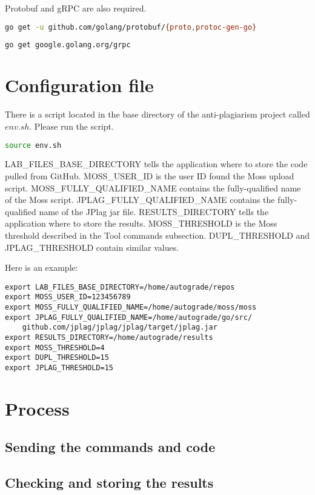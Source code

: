 \documentclass[12pt]{article}
\begin{document}
			Protobuf and gRPC are also required.

			\begin{lstlisting}[language=bash]
go get -u github.com/golang/protobuf/{proto,protoc-gen-go}
			
go get google.golang.org/grpc
			\end{lstlisting}
			 
			
	\section{Configuration file}
		There is a script located in the base directory of the anti-plagiarism project called $env.sh$. Please run the script.
		\begin{lstlisting}[language=bash]
source env.sh
		\end{lstlisting}
		
		LAB\_FILES\_BASE\_DIRECTORY tells the application where to store the code pulled from GitHub. MOSS\_USER\_ID is the user ID found the Moss upload script. MOSS\_FULLY\_QUALIFIED\_NAME contains the fully-qualified name of the Moss script. JPLAG\_FULLY\_QUALIFIED\_NAME contains the fully-qualified name of the JPlag jar file. RESULTS\_DIRECTORY tells the application where to store the results. MOSS\_THRESHOLD is the Moss threshold described in the Tool commands subsection. DUPL\_THRESHOLD and JPLAG\_THRESHOLD contain similar values.
			
		Here is an example:
		\begin{lstlisting}
export LAB_FILES_BASE_DIRECTORY=/home/autograde/repos
export MOSS_USER_ID=123456789
export MOSS_FULLY_QUALIFIED_NAME=/home/autograde/moss/moss
export JPLAG_FULLY_QUALIFIED_NAME=/home/autograde/go/src/
	github.com/jplag/jplag/jplag/target/jplag.jar
export RESULTS_DIRECTORY=/home/autograde/results
export MOSS_THRESHOLD=4
export DUPL_THRESHOLD=15
export JPLAG_THRESHOLD=15
		\end{lstlisting}		

	\section{Process}
		
		\subsection{Sending the commands and code}
			
		\subsection{Checking and storing the results}
\end{document}
